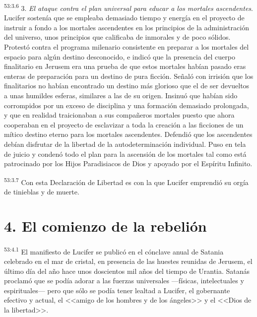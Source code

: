 \par
\textsuperscript{53:3.6} 3. \textit{El ataque contra el plan universal para educar a los mortales ascendentes}. Lucifer sostenía que se empleaba demasiado tiempo y energía en el proyecto de instruir a fondo a los mortales ascendentes en los principios de la administración del universo, unos principios que calificaba de inmorales y de poco sólidos. Protestó contra el programa milenario consistente en preparar a los mortales del espacio para algún destino desconocido, e indicó que la presencia del cuerpo finalitario en Jerusem era una prueba de que estos mortales habían pasado eras enteras de preparación para un destino de pura ficción. Señaló con irrisión que los finalitarios no habían encontrado un destino más glorioso que el de ser devueltos a unas humildes esferas, similares a las de su origen. Insinuó que habían sido corrompidos por un exceso de disciplina y una formación demasiado prolongada, y que en realidad traicionaban a sus compañeros mortales puesto que ahora cooperaban en el proyecto de esclavizar a toda la creación a las ficciones de un mítico destino eterno para los mortales ascendentes. Defendió que los ascendentes debían disfrutar de la libertad de la autodeterminación individual. Puso en tela de juicio y condenó todo el plan para la ascensión de los mortales tal como está patrocinado por los Hijos Paradisiacos de Dios y apoyado por el Espíritu Infinito.

\par
\textsuperscript{53:3.7} Con esta Declaración de Libertad es con la que Lucifer emprendió su orgía de tinieblas y de muerte.

\section*{4. El comienzo de la rebelión}
\par
\textsuperscript{53:4.1} El manifiesto de Lucifer se publicó en el cónclave anual de Satania celebrado en el mar de cristal, en presencia de las huestes reunidas de Jerusem, el último día del año hace unos doscientos mil años del tiempo de Urantia. Satanás proclamó que se podía adorar a las fuerzas universales ---físicas, intelectuales y espirituales--- pero que sólo se podía tener lealtad a Lucifer, el gobernante efectivo y actual, el <<amigo de los hombres y de los ángeles>> y el <<Dios de la libertad>>.

